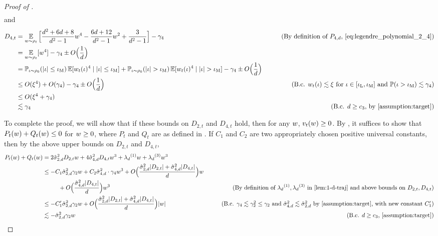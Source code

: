 \begin{proof}[Proof of ]
\begin{align}
\end{align}
and
\begin{align}
D_{4, t}
& = \E_{\w \sim \rho_t} \Big[\frac{d^2 + 6d + 8}{d^2 - 1} \w^4 - \frac{6d + 12}{d^2 - 1} \w^2 + \frac{3}{d^2 - 1}\Big] - \gamma_4 & \tag{By definition of $\PfourD$, \Cref{eq:legendre_polynomial_2_4}} \\
& = \E_{\w \sim \rho_t} [\w^4] - \gamma_4 \pm O\Big(\frac{1}{d}\Big) \\
& = \Prob_{\iota \sim \rho_0} (|\iota| \leq \iotamid) \E[\w_t(\iota)^4 \mid |\iota| \leq \iotamid] + \Prob_{\iota \sim \rho_0} (|\iota| > \iotamid) \E[\w_t(\iota)^4 \mid |\iota| > \iotamid] - \gamma_4 \pm O\Big(\frac{1}{d}\Big) \\
& \leq O(\xi^4) + O(\gamma_4) - \gamma_4 \pm O\Big(\frac{1}{d}\Big)
& \tag{B.c. $\w_t(\iota) \lesssim \xi$ for $\iota \in [\iotaL, \iotamid]$ and $\Prob(\iota > \iotamid) \lesssim \gamma_4$} \\
& \leq O(\xi^4 + \gamma_4) \\
& \lesssim \gamma_4
& \tag{B.c. $d \geq c_3$, by \Cref{assumption:target}}
\end{align}

To complete the proof, we will show that if these bounds on $D_{2, t}$ and $D_{4, t}$ hold, then for any $w$, $v_t(w) \geq 0$. By , it suffices to show that $P_t(w) + Q_t(w) \leq 0$ for $w \geq 0$, where $P_t$ and $Q_t$ are as defined in . If $C_1$ and $C_2$ are two appropriately chosen positive universal constants, then by the above upper bounds on $D_{2, t}$ and $D_{4, t}$,
\begin{align}
P_t(\w) + Q_t(\w)
& = 2 \sigmaCoeffTwo^2 D_{2, t} \w + 4 \sigmaCoeffFour^2 D_{4, t} \w^3 + \lambdaD^{(1)} \w + \lambdaD^{(3)} \w^3 \\
& \leq -C_1 \sigmaCoeffTwo^2 \gamma_2 \w + C_2 \sigmaCoeffFour^2 \cdot \gamma_4 \w^3 + O\Big(\frac{\sigmaCoeffTwo^2 |D_{2, t}| + \sigmaCoeffFour^2 |D_{4, t}|}{d}\Big) \w \\
&\nextlinespace + O\Big(\frac{\sigmaCoeffFour^2 |D_{4, t}|}{d}\Big) \w^3
& \tag{By definition of $\lambdaD^{(1)}, \lambdaD^{(3)}$ in \Cref{lem:1-d-traj} and above bounds on $D_{2, t}, D_{4, t}$} \\
& \leq -C_1' \sigmaCoeffTwo^2 \gamma_2 \w + O\Big(\frac{\sigmaCoeffTwo^2 |D_{2, t}| + \sigmaCoeffFour^2 |D_{4, t}|}{d}\Big) |\w| 
& \tag{B.c. $\gamma_4 \lesssim \gamma_2^2 \leq \gamma_2$ and $\sigmaCoeffFour^2 \lesssim \sigmaCoeffTwo^2$ by \Cref{assumption:target}, with new constant $C_1'$} \\
& \lesssim -\sigmaCoeffTwo^2 \gamma_2 \w
& \tag{B.c. $d \geq c_3$, \Cref{assumption:target}}
\end{align}


\end{proof}
